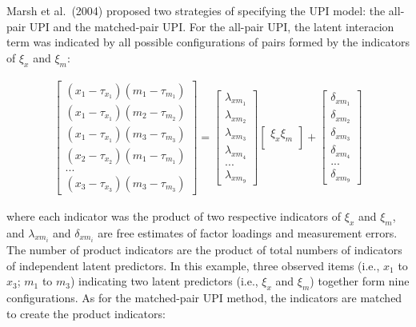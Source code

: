 \documentclass[
  man]{apa7}
\begin{document}
Marsh et al.~(2004) proposed two strategies of specifying the UPI model: the all-pair UPI and the matched-pair UPI. For the all-pair UPI, the latent interacion term was indicated by all possible configurations of pairs formed by the indicators of \(\xi_{x}\) and \(\xi_m\):

\begin{align}
    \begin{bmatrix}
        (x_{1} - \tau_{x_{1}})(m_{1} - \tau_{m_{1}}) \\
        (x_{1} - \tau_{x_{1}})(m_{2} - \tau_{m_{2}}) \\
        (x_{1} - \tau_{x_{1}})(m_{3} - \tau_{m_{3}}) \\ 
        (x_{2} - \tau_{x_{2}})(m_{1} - \tau_{m_{1}}) \\
        ... \\
        (x_{3} - \tau_{x_{3}})(m_{3} - \tau_{m_{3}})
    \end{bmatrix} = 
    \begin{bmatrix}
        \lambda_{xm_{1}} \\
        \lambda_{xm_{2}} \\ 
        \lambda_{xm_{3}} \\ 
        \lambda_{xm_{4}} \\ 
        ...\\
        \lambda_{xm_{9}}
    \end{bmatrix}
    \begin{bmatrix}
        \xi_{x}\xi_{m} \\
    \end{bmatrix} +
    \begin{bmatrix}
        \delta_{xm_{1}} \\
        \delta_{xm_{2}} \\ 
        \delta_{xm_{3}} \\
        \delta_{xm_{4}} \\
        ... \\
        \delta_{xm_{9}}
    \end{bmatrix}
\end{align}

where each indicator was the product of two respective indicators of \(\xi_{x}\) and \(\xi_{m}\), and \({\lambda_{xm_{i}}}\) and \({\delta_{xm_{i}}}\) are free estimates of factor loadings and measurement errors. The number of product indicators are the product of total numbers of indicators of independent latent predictors. In this example, three observed items (i.e., \(x_{1}\) to \(x_3\); \(m_{1}\) to \(m_3\)) indicating two latent predictors (i.e., \(\xi_{x}\) and \(\xi_{m}\)) together form nine configurations. As for the matched-pair UPI method, the indicators are matched to create the product indicators:
\end{document}
